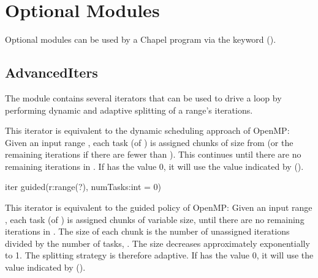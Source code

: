 \section{Optional Modules}

Optional modules can be used by a Chapel program via the 
keyword ().

\subsection{AdvancedIters}
\label{AdvancedIters}

The  module contains several iterators that can be
used to drive a  loop by performing dynamic and adaptive splitting
of a range's iterations.

\begin{protohead}
iter dynamic(r:range(?), chunkSize:int, numTasks:int=0) {
\end{protohead}
\begin{protobody}

  This iterator is equivalent to the dynamic scheduling approach of
  OpenMP: Given an input range , each task (of
  ) is assigned chunks of size  from
   (or the remaining iterations if there are fewer than
  ). This continues until there are no remaining
  iterations in .  If  has the value 0, it will
  use the value indicated by 
  ().

\end{protobody}

\begin{protohead}
iter guided(r:range(?), numTasks:int = 0)
\end{protohead}
\begin{protobody}
  This iterator is equivalent to the guided policy of OpenMP: Given an
  input range , each task (of ) is assigned
  chunks of variable size, until there are no remaining iterations in
  . The size of each chunk is the number of unassigned
  iterations divided by the number of tasks, . The size
  decreases approximately exponentially to 1. The splitting strategy
  is therefore adaptive.  If  has the value 0, it will
  use the value indicated by 
  ().

\end{protobody}

